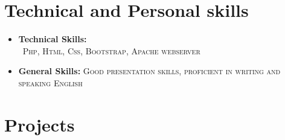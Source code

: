 \documentclass[11pt,a4paper,SANS]{moderncv}        %
\begin{document}
\section{Technical and Personal skills}

\vspace{6pt}

\begin{itemize}

\item \textbf{\color{gray}Technical Skills:}\\ 
 {\ \textsc{Php}, \textsc{Html}, \textsc{Css}, \textsc{Bootstrap}, \textsc{Apache webserver}}

\vspace{6pt}



\item \textbf{\color{gray}General Skills:} \textsc{Good presentation skills}, \textsc{proficient in writing and speaking English}

\vspace{6pt}
\end{itemize}
\section{Projects}

\vspace{5pt}
\end{document}
